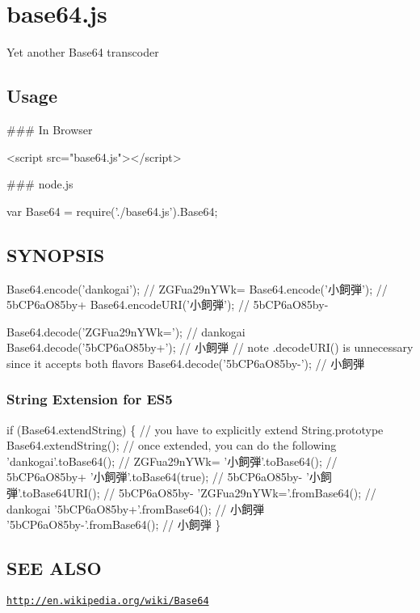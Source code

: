 \href{http://travis-ci.org/dankogai/js-base64}{\tt }

\section*{base64.\+js}

Yet another Base64 transcoder

\subsection*{Usage}

\#\#\# In Browser 
\begin{DoxyCode}
<script src="base64.js"></script>
\end{DoxyCode}
 \#\#\# node.\+js 
\begin{DoxyCode}
var Base64 = require('./base64.js').Base64;
\end{DoxyCode}


\subsection*{S\+Y\+N\+O\+P\+S\+IS}


\begin{DoxyCode}
Base64.encode('dankogai');  // ZGFua29nYWk=
Base64.encode('小飼弾');    // 5bCP6aO85by+
Base64.encodeURI('小飼弾'); // 5bCP6aO85by-

Base64.decode('ZGFua29nYWk=');  // dankogai
Base64.decode('5bCP6aO85by+');  // 小飼弾
// note .decodeURI() is unnecessary since it accepts both flavors
Base64.decode('5bCP6aO85by-');  // 小飼弾
\end{DoxyCode}


\subsubsection*{String Extension for E\+S5}


\begin{DoxyCode}
if (Base64.extendString) \{
    // you have to explicitly extend String.prototype
    Base64.extendString();
    // once extended, you can do the following
    'dankogai'.toBase64();       // ZGFua29nYWk=
    '小飼弾'.toBase64();         // 5bCP6aO85by+
    '小飼弾'.toBase64(true);     // 5bCP6aO85by-
    '小飼弾'.toBase64URI();      // 5bCP6aO85by-
    'ZGFua29nYWk='.fromBase64(); // dankogai
    '5bCP6aO85by+'.fromBase64(); // 小飼弾
    '5bCP6aO85by-'.fromBase64(); // 小飼弾
\}
\end{DoxyCode}


\subsection*{S\+EE A\+L\+SO}


\begin{DoxyItemize}
\item \href{http://en.wikipedia.org/wiki/Base64}{\tt http\+://en.\+wikipedia.\+org/wiki/\+Base64} 
\end{DoxyItemize}